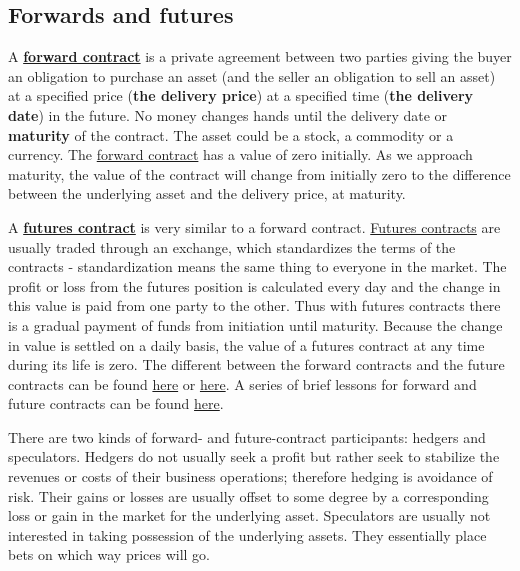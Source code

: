 \subsection{Forwards and futures}
A \href{https://en.wikipedia.org/wiki/Forward_contract}{\textbf{forward contract}} is a private agreement between two parties giving the buyer an obligation to purchase an asset (and the seller an obligation to sell an asset) at a specified price (\textbf{the delivery price}) at a specified time (\textbf{the delivery date}) in the future. No money changes hands until the delivery date or \textbf{maturity} of the contract. The asset could be a stock, a commodity or a currency. The \href{https://investinganswers.com/dictionary/f/forward-contract}{forward contract} has a value of zero initially. As we approach maturity, the value of the contract will change from initially zero to the difference between the underlying asset and the delivery price, at maturity.

A \href{https://en.wikipedia.org/wiki/Futures_contract}{\textbf{futures contract}} is very similar to a forward contract. \href{https://investinganswers.com/dictionary/f/futures-contract}{Futures contracts} are usually traded through an exchange, which standardizes the terms of the contracts - standardization means the same thing to everyone in the market. The profit or loss from the futures position is calculated every day and the change in this value is paid from one party to the other. Thus with futures contracts there is a gradual payment of funds from initiation until maturity. Because the change in value is settled on a daily basis, the value of a futures contract at any time during its life is zero. The different between the forward contracts and the future contracts can be found \href{https://en.wikipedia.org/wiki/Futures_contract}{here} or \href{https://www.investopedia.com/ask/answers/06/forwardsandfutures.asp}{here}. A series of brief lessons for forward and future contracts can be found \href{https://financetrain.com/series/futures-forwards/}{here}.

There are two kinds of forward- and future-contract participants: hedgers and speculators. Hedgers do not usually seek a profit but rather seek to stabilize the revenues or costs of their business operations; therefore hedging is avoidance of risk. Their gains or losses are usually offset to some degree by a corresponding loss or gain in the market for the underlying asset. Speculators are usually not interested in taking possession of the underlying assets. They essentially place bets on which way prices will go. 

